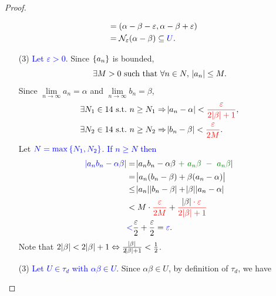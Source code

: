 \documentclass[11pt,openany]{article}
\begin{document}
\begin{note}[]
\begin{proof}
\begin{flushleft}
\begin{minipage}[t]{0.485\textwidth}
\begin{enumerate}
\begin{align*}
		&=\intoo{\alpha-\beta-\varepsilon,\alpha-\beta+\varepsilon}\\
		&=\nbhd_\varepsilon(\alpha-\beta)\subseteq\textcolor{blue}{U}.
	\end{align*}
\end{enumerate}
\end{minipage}
\end{flushleft}
\begin{flushleft}
\begin{minipage}[t]{0.45\textwidth}
\begin{enumerate}
	\item[(3)] \textcolor{blue}{Let $\varepsilon>0$}. Since $\set{a_n}$ is bounded, \[
	\exists M>0\ \text{such that}\ \forall n\in N,\ \abs{a_n}\leq M.
	\] Since $\lim\limits_{n\to\infty}a_n=\alpha$ and $\lim\limits_{n\to\infty}b_n=\beta$, \begin{align*}
	&\exists N_1\in14\ \text{s.t.}\ n\geq N_1\Rightarrow\abs{a_n-\alpha}<\textcolor{red}{\frac{\varepsilon}{2\abs{\beta}+1}},\\ 
	&\exists N_2\in14\ \text{s.t.}\ n\geq N_2\Rightarrow\abs{b_n-\beta}<\textcolor{red}{\frac{\varepsilon}{2M}}.
	\end{align*} Let $\textcolor{blue}{N=\max\set{N_1,N_2}}$. \textcolor{blue}{If $n\geq N$ then} \begin{align*}
		\textcolor{blue}{\abs{a_nb_n-\alpha\beta}}
		&=\abs{a_nb_n-\alpha\beta\ \textcolor{green!50!black}{+\ a_n\beta\ -\ a_n\beta}}\\
		&=\abs{a_n(b_n-\beta)+\beta(a_n-\alpha)}\\
		&\leq\abs{a_n}\abs{b_n-\beta}+\abs{\beta}\abs{a_n-\alpha}\\
		&<M\cdot\textcolor{red}{\frac{\varepsilon}{2M}}+\textcolor{red}{\frac{\textcolor{black}{\abs{\beta}}\cdot\varepsilon}{2\abs{\beta}+1}}\\
		&\textcolor{blue}{<}\frac{\varepsilon}{2}+\frac{\varepsilon}{2}=\textcolor{blue}{\varepsilon}.
	\end{align*} \textcolor{gray!50}{Note that $2\abs{\beta}<2\abs{\beta}+1\Leftrightarrow\frac{\abs{\beta}}{2\abs{\beta}+1}<\frac{1}{2}$.}
\end{enumerate}
\end{minipage}%
\vline
\begin{minipage}[t]{0.495\textwidth}
\begin{enumerate}
	\item[(3)] \textcolor{blue}{Let $U\in\tau_d$ with $\alpha\beta\in U$}. Since $\alpha\beta\in U$, by definition of $\tau_d$, we have \[
\]
\end{enumerate}
\end{minipage}
\end{flushleft}
\end{proof}
\end{note}
\end{document}
